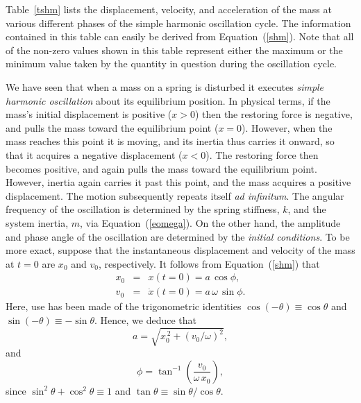 Table~\ref{tshm} lists the displacement, velocity, and acceleration of the mass at various different phases of the
simple harmonic oscillation cycle. The information contained in this table can easily be derived from Equation~(\ref{shm}). Note that all of the non-zero values
shown in this table represent either the maximum or the minimum value taken by   the quantity in question during the
oscillation  cycle.

We have seen that when a mass on a spring is disturbed  it executes {\em simple harmonic
oscillation}\/ about its equilibrium position. In physical terms, if the mass's initial displacement is positive ($x>0$) then the
 restoring force is negative, and pulls the mass toward the equilibrium point ($x=0$). However,
 when the  mass reaches this point it is moving, and its inertia thus carries it onward,
 so that it acquires a negative displacement ($x<0$). The restoring force then becomes positive, and again pulls the mass toward the equilibrium point. However,  inertia again carries it past this point, and the mass   acquires a positive displacement.
The motion subsequently repeats itself {\em ad infinitum}. 
The angular frequency of the oscillation is determined by the spring stiffness, $k$,  and the system
inertia, $m$,  via Equation~(\ref{eomega}). 
On the other hand, the amplitude and phase angle of the oscillation are determined by the {\em initial conditions}. 
To be more exact, suppose that the instantaneous displacement and velocity of the mass at $t=0$ are $x_0$ and $v_0$,
respectively. It follows from Equation~(\ref{shm}) that
\begin{eqnarray}
x_0 &=& x(t=0) = a\,\cos\phi,\label{e2.9}\\[0.5ex]
v_0 &=& \dot{x}(t=0) =a\,\omega\,\sin\phi.
\end{eqnarray}
Here, use has been made of the trigonometric identities $\cos(-\theta) \equiv\cos\theta$ and $\sin(-\theta)
\equiv-\sin\theta$. Hence, we deduce that
\begin{equation}
a = \sqrt{x_0^{\,2} + (v_0/\omega)^2},
\end{equation}
and
\begin{equation}\label{e2.12}
\phi =\tan^{-1}\!\left(\frac{v_0}{\omega\,x_0}\right),
\end{equation}
since $\sin^2\theta+\cos^2\theta \equiv 1$ and $\tan\theta \equiv \sin\theta/\cos\theta$.

